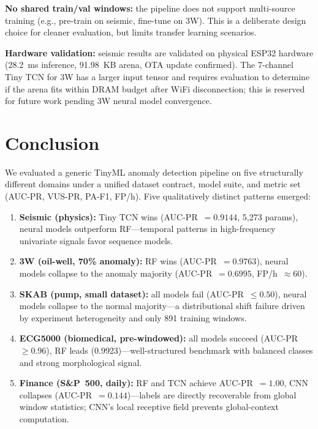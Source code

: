 \documentclass[conference]{IEEEtran}
\begin{document}
\textbf{No shared train/val windows:} the pipeline does not support
multi-source training (e.g., pre-train on seismic, fine-tune on 3W).
This is a deliberate design choice for cleaner evaluation, but limits
transfer learning scenarios.

\textbf{Hardware validation:} seismic results are validated on physical
ESP32 hardware (28.2~ms inference, 91.98~KB arena, OTA update confirmed).
The 7-channel Tiny TCN for 3W has a larger input tensor and requires
evaluation to determine if the arena fits within DRAM budget after WiFi
disconnection; this is reserved for future work pending 3W neural model
convergence.

\section{Conclusion}
\label{sec:conclusion}

We evaluated a generic TinyML anomaly detection pipeline on five
structurally different domains under a unified dataset contract, model
suite, and metric set (AUC-PR, VUS-PR, PA-F1, FP/h).
Five qualitatively distinct patterns emerged:

\begin{enumerate}
  \item \textbf{Seismic (physics):} Tiny TCN wins (AUC-PR~$=0.9144$, 5{,}273 params),
        neural models outperform RF---temporal patterns in high-frequency
        univariate signals favor sequence models.
  \item \textbf{3W (oil-well, 70\% anomaly):} RF wins (AUC-PR~$=0.9763$),
        neural models collapse to the anomaly majority
        (AUC-PR~$=0.6995$, FP/h~$\approx60$).
  \item \textbf{SKAB (pump, small dataset):} all models fail (AUC-PR~$\leq0.50$),
        neural models collapse to the normal majority---a distributional
        shift failure driven by experiment heterogeneity and only 891 training windows.
  \item \textbf{ECG5000 (biomedical, pre-windowed):} all models succeed
        (AUC-PR~$\geq0.96$), RF leads (0.9923)---well-structured benchmark
        with balanced classes and strong morphological signal.
  \item \textbf{Finance (S\&P~500, daily):} RF and TCN achieve AUC-PR~$=1.00$,
        CNN collapses (AUC-PR~$=0.144$)---labels are directly recoverable from
        global window statistics; CNN's local receptive field prevents
        global-context computation.
\end{enumerate}
\end{document}
